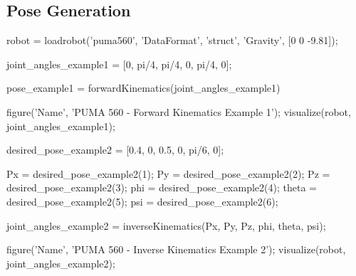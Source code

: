 \documentclass[conference]{IEEEtran}
\begin{document}
\subsection{Pose Generation}
\label{appendix:PoseGen}
\begin{matlabcode}[label={PoseGenAppendix}]


robot = loadrobot('puma560', 'DataFormat', 'struct', 'Gravity', [0 0 -9.81]);

joint_angles_example1 = [0, pi/4, pi/4, 0, pi/4, 0];

pose_example1 = forwardKinematics(joint_angles_example1)


figure('Name', 'PUMA 560 - Forward Kinematics Example 1');
visualize(robot, joint_angles_example1);

desired_pose_example2 = [0.4, 0, 0.5, 0, pi/6, 0];

Px = desired_pose_example2(1);
Py = desired_pose_example2(2);
Pz = desired_pose_example2(3);
phi = desired_pose_example2(4);
theta = desired_pose_example2(5);
psi = desired_pose_example2(6);

joint_angles_example2 = inverseKinematics(Px, Py, Pz, phi, theta, psi);

figure('Name', 'PUMA 560 - Inverse Kinematics Example 2');
visualize(robot, joint_angles_example2);
\end{matlabcode}
\end{document}
